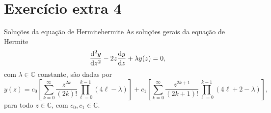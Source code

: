 \section{Exercício extra 4}
\begin{proposition}{Soluções da equação de Hermite}{hermite}
    As soluções gerais da equação de Hermite
    \begin{equation*}
        \diff[2]yz - 2z\diff{y}{z} + \lambda y(z) = 0,
    \end{equation*}
    com \(\lambda \in \mathbb{C}\) constante, são dadas por
    \begin{equation*}
        y(z) = c_0\left[ \sum_{k = 0}^\infty \frac{z^{2k}}{(2k)!}\prod_{\ell = 0}^{k - 1} (4\ell - \lambda)\right] + c_1\left[ \sum_{k = 0}^\infty \frac{z^{2k + 1}}{(2k+1)!}\prod_{\ell = 0}^{k - 1} (4\ell + 2 - \lambda)\right],
    \end{equation*}
    para todo \(z \in \mathbb{C}\), com \(c_0, c_1 \in \mathbb{C}\).
\end{proposition}
